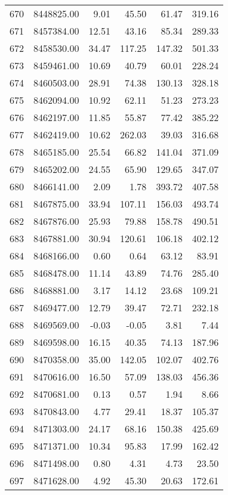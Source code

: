 \begin{table}[ht]
\begin{tabular}{rrrrrr}
  670 & 8448825.00 & 9.01 & 45.50 & 61.47 & 319.16 \\ 
  671 & 8457384.00 & 12.51 & 43.16 & 85.34 & 289.33 \\ 
  672 & 8458530.00 & 34.47 & 117.25 & 147.32 & 501.33 \\ 
  673 & 8459461.00 & 10.69 & 40.79 & 60.01 & 228.24 \\ 
  674 & 8460503.00 & 28.91 & 74.38 & 130.13 & 328.18 \\ 
  675 & 8462094.00 & 10.92 & 62.11 & 51.23 & 273.23 \\ 
  676 & 8462197.00 & 11.85 & 55.87 & 77.42 & 385.22 \\ 
  677 & 8462419.00 & 10.62 & 262.03 & 39.03 & 316.68 \\ 
  678 & 8465185.00 & 25.54 & 66.82 & 141.04 & 371.09 \\ 
  679 & 8465202.00 & 24.55 & 65.90 & 129.65 & 347.07 \\ 
  680 & 8466141.00 & 2.09 & 1.78 & 393.72 & 407.58 \\ 
  681 & 8467875.00 & 33.94 & 107.11 & 156.03 & 493.74 \\ 
  682 & 8467876.00 & 25.93 & 79.88 & 158.78 & 490.51 \\ 
  683 & 8467881.00 & 30.94 & 120.61 & 106.18 & 402.12 \\ 
  684 & 8468166.00 & 0.60 & 0.64 & 63.12 & 83.91 \\ 
  685 & 8468478.00 & 11.14 & 43.89 & 74.76 & 285.40 \\ 
  686 & 8468881.00 & 3.17 & 14.12 & 23.68 & 109.21 \\ 
  687 & 8469477.00 & 12.79 & 39.47 & 72.71 & 232.18 \\ 
  688 & 8469569.00 & -0.03 & -0.05 & 3.81 & 7.44 \\ 
  689 & 8469598.00 & 16.15 & 40.35 & 74.13 & 187.96 \\ 
  690 & 8470358.00 & 35.00 & 142.05 & 102.07 & 402.76 \\ 
  691 & 8470616.00 & 16.50 & 57.09 & 138.03 & 456.36 \\ 
  692 & 8470681.00 & 0.13 & 0.57 & 1.94 & 8.66 \\ 
  693 & 8470843.00 & 4.77 & 29.41 & 18.37 & 105.37 \\ 
  694 & 8471303.00 & 24.17 & 68.16 & 150.38 & 425.69 \\ 
  695 & 8471371.00 & 10.34 & 95.83 & 17.99 & 162.42 \\ 
  696 & 8471498.00 & 0.80 & 4.31 & 4.73 & 23.50 \\ 
  697 & 8471628.00 & 4.92 & 45.30 & 20.63 & 172.61 \\ 

\end{tabular}
\end{table}
